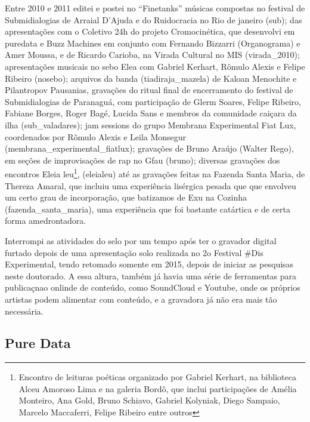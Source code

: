 


Entre 2010 e 2011 editei e postei no ``Finetanks'' músicas compostas no festival de Submidialogias de Arraial D'Ajuda e do Ruidocracia no Rio de janeiro (\/sub\/); das apresentações com o Coletivo 24h do projeto Cromocinética, que desenvolvi em puredata e Buzz Machines em conjunto com Fernando Bizzarri (Organograma) e Amer Moussa, e de Ricardo Carioba, na Virada Cultural no MIS (virada\_2010\/); apresentações musicais no sebo Elea com Gabriel Kerhart, Rômulo Alexis e Felipe Ribeiro (nosebo\/); arquivos da banda (tiadiraja\_mazela\/) de Kaloan Menochite e Pilantropov Pausanias, gravações do ritual final de encerramento do festival de Submidialogias de Paranaguá, com participação de Glerm Soares, Felipe Ribeiro, Fabiane Borges, Roger Bagé, Lucida Sans e membros da comunidade caiçara da ilha (\/sub\_valadares\/); jam sessions do grupo Membrana Experimental Fiat Lux, coordenados por Rômulo Alexis e Leila Monsegur (membrana\_experimental\_fiatlux\/); gravações de Bruno Araújo (Walter Rego), em seções de improvisações de rap no Gfau (bruno\/); diversas gravações dos encontros Eleia leu\footnote{Encontro de leituras poéticas organizado por Gabriel Kerhart, na biblioteca Alceu Amoroso Lima e na galeria Bordô, que inclui participações de Amélia Monteiro, Ana Gold, Bruno Schiavo, Gabriel Kolyniak, Diego Sampaio, Marcelo Maccaferri, Felipe Ribeiro entre outros}, (\/eleialeu\/) até as gravações feitas na Fazenda Santa Maria, de Thereza Amaral, que incluiu uma experiência lisérgica pesada que que envolveu um certo grau de incorporação, que batizamos de Exu na Cozinha (\/fazenda\_santa\_maria\/), uma experiência que foi bastante catártica e de certa forma amedrontadora. 

Interrompi as atividades do selo por um tempo após ter o gravador digital furtado depois de uma apresentação solo realizada no 2o Festival \#Dis Experimental, tendo retomado somente em 2015, depois de iniciar as pesquisas neste doutorado. A essa altura, também já havia uma série de ferramentas para publicaçnao onlinde de conteúdo, como SoundCloud e Youtube, onde os próprios artistas podem alimentar com conteúdo, e a gravadora já não era mais tão necessária.



\subsection{Pure Data}

